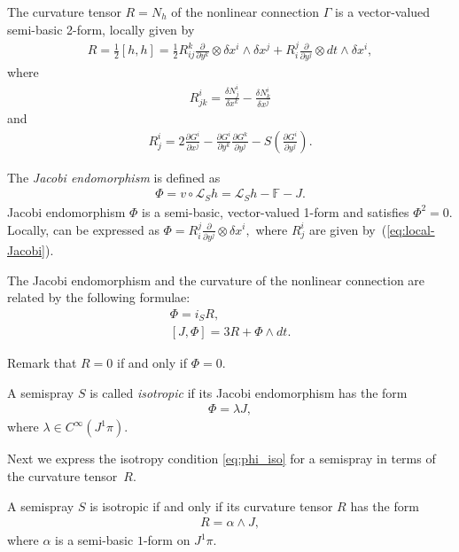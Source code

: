 The curvature tensor $R=N_{h}$ of the nonlinear connection $\Gamma$
is a vector-valued semi-basic 2-form, locally given by
\begin{gather}
R=\frac{1}{2}[h,h]=\frac{1}{2}R_{ij}^{k}\frac{\partial}{\partial y^{k}}\otimes\delta x^{i}\wedge\delta x^{j}+R_{i}^{j}\frac{\partial}{\partial y^{j}}\otimes dt\wedge\delta x^{i},\label{eq:19}
\end{gather}
 where \begin{gather*}
R_{jk}^{i}=\frac{\delta N_{j}^{i}}{\delta x^{k}}-\frac{\delta N_{k}^{i}}{\delta x^{j}}%
\end{gather*}
 and \begin{gather}
R_{j}^{i}=2\frac{\partial G^{i}}{\partial x^{j}}-\frac{\partial G^{i}}{\partial y^{k}}\frac{\partial G^{k}}{\partial y^{j}}-S\left(\frac{\partial G^{i}}{\partial y^{j}}\right).\label{eq:local-Jacobi}
\end{gather}


The \emph{Jacobi endomorphism} is def\/ined as \begin{gather}
\Phi=v\circ\mathcal{L}_{S}h=\mathcal{L}_{S}h-\mathbb{F}-J.\label{eq:22}\end{gather}
 Jacobi endomorphism $\Phi$ is a semi-basic, vector-valued 1-form
and satisf\/ies $\Phi^{2}=0$. Locally, can be expressed as $\Phi=R_{i}^{j}\frac{\partial}{\partial y^{j}}\otimes\delta x^{i},$
where $R_{j}^{i}$ are given by~(\ref{eq:local-Jacobi}).

The Jacobi endomorphism and the curvature of the nonlinear connection
are related by the following formulae:
\begin{gather}
\Phi   =   i_{S}R,\label{eq:23'}\\
\left[J,\Phi\right]   =   3R+\Phi\wedge dt.\label{eq:24'}
\end{gather}


Remark that $R=0$ if and only if $\Phi=0$.

\begin{definition}
A semispray $S$ is called \emph{isotropic} if its Jacobi endomorphism
has the form \begin{gather}
\Phi=\lambda J,
\label{eq:phi_iso}
\end{gather}
 where $\lambda\in C^{\infty}(J^{1}\pi)$.
\end{definition}
Next we express the isotropy condition \eqref{eq:phi_iso} for a semispray
in terms of the curvature tensor~$R$.

\begin{proposition}
\label{prop:iso} A semispray $S$ is isotropic if and only if its
curvature tensor $R$ has the form
\begin{gather*}
R=\alpha\wedge J,%
\end{gather*}
 where $\alpha$ is a semi-basic $1$-form on $J^{1}\pi$.
\end{proposition}

